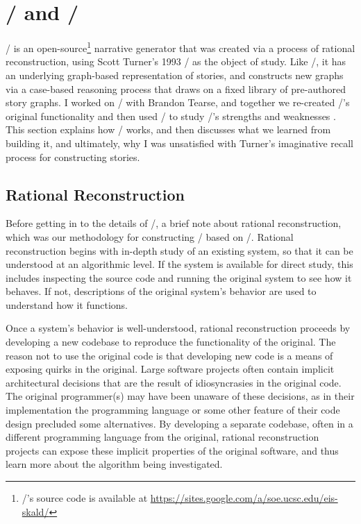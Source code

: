 \chapter{\minstrel/ and \skald/}

\label{ch:skald}

\skald/ is an open-source\footnote{\skald/'s source code is available at \url{https://sites.google.com/a/soe.ucsc.edu/eis-skald/}} narrative generator that was created via a process of rational reconstruction, using Scott Turner's 1993 \minstrel/ as the object of study.
%
Like \minstrel/, it has an underlying graph-based representation of stories, and constructs new graphs via a case-based reasoning process that draws on a fixed library of pre-authored story graphs.
%
I worked on \skald/ with Brandon Tearse, and together we re-created \minstrel/'s original functionality and then used \skald/ to study \minstrel/'s strengths and weaknesses \cite{Tearse2011, Tearse2012, Tearse2014}.
%
This section explains how \skald/ works, and then discusses what we learned from building it, and ultimately, why I was unsatisfied with Turner's imaginative recall process for constructing stories.



\section{Rational Reconstruction}


Before getting in to the details of \skald/, a brief note about rational reconstruction, which was our methodology for constructing \skald/ based on \minstrel/.
%
Rational reconstruction begins with in-depth study of an existing system, so that it can be understood at an algorithmic level.
%
If the system is available for direct study, this includes inspecting the source code and running the original system to see how it behaves.
%
If not, descriptions of the original system's behavior are used to understand how it functions.


Once a system's behavior is well-understood, rational reconstruction proceeds by developing a new codebase to reproduce the functionality of the original.
%
The reason not to use the original code is that developing new code is a means of exposing quirks in the original.
%
Large software projects often contain implicit architectural decisions that are the result of idiosyncrasies in the original code.
%
The original programmer(s) may have been unaware of these decisions, as in their implementation the programming language or some other feature of their code design precluded some alternatives.
%
By developing a separate codebase, often in a different programming language from the original, rational reconstruction projects can expose these implicit properties of the original software, and thus learn more about the algorithm being investigated.


